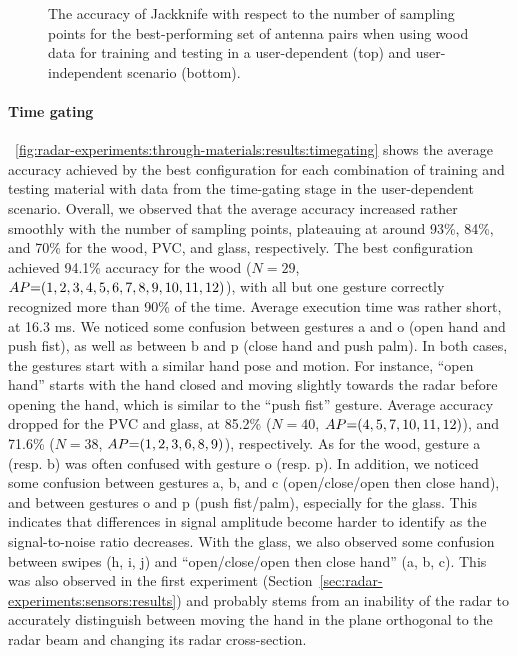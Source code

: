 \begin{figure}[!t]
    \vspace{-6pt}
    \caption{The accuracy of Jackknife with respect to the number of sampling points for the best-performing set of antenna pairs when using wood data for training and testing in a user-dependent (top) and user-independent scenario (bottom).}
    \label{fig:radar-experiments:through-materials:wood-samples}
\end{figure}

\paragraph{Time gating}

\fig~\ref{fig:radar-experiments:through-materials:results:timegating} shows the average accuracy achieved by the best configuration for each combination of training and testing material with data from the time-gating stage in the user-dependent scenario.
%
Overall, we observed that the average accuracy increased rather smoothly with the number of sampling points, plateauing at around 93\%, 84\%, and 70\% for the wood, PVC, and glass, respectively.
The best configuration achieved 94.1\% accuracy for the wood ($N{=}29$, $\splitatcommas{AP{=}(1, 2, 3, 4, 5, 6, 7, 8, 9, 10, 11, 12)}$), with all but one gesture correctly recognized more than 90\% of the time. Average execution time was rather short, at 16.3 ms.
%
We noticed some confusion between gestures a and o (open hand and push fist), as well as between b and p (close hand and push palm). In both cases, the gestures start with a similar hand pose and motion. For instance, ``open hand'' starts with the hand closed and moving slightly towards the radar before opening the hand, which is similar to the ``push fist'' gesture.
Average accuracy dropped for the PVC and glass, at 85.2\% ($N{=}40$, $\splitatcommas{AP{=}(4, 5, 7, 10, 11, 12)}$), and 71.6\% ($N{=}38$, $\splitatcommas{AP{=}(1, 2, 3, 6, 8, 9)}$), respectively.
%
As for the wood, gesture a (resp. b) was often confused with gesture o (resp. p).
%
In addition, we noticed some confusion between gestures a, b, and c (open/close/open then close hand), and between gestures o and p (push fist/palm), especially for the glass. This indicates that differences in signal amplitude become harder to identify as the signal-to-noise ratio decreases.
%
With the glass, we also observed some confusion between swipes (h, i, j) and ``open/close/open then close hand'' (a, b, c). This was also observed in the first experiment (Section~\ref{sec:radar-experiments:sensors:results}) and probably stems from an inability of the radar to accurately distinguish between moving the hand in the plane orthogonal to the radar beam and changing its radar cross-section.

